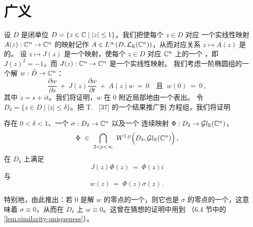 
\section{广义\trSimilarityPrinciple}
\label{sec:generalized-similarity-principle}

%
%

设 $D$ 是闭单位\trDisc{} $D=\{z\in\mathbb{C}\mid |z|\leq1\}$。我们把使每个 $z\in D$ 对应%
一个实线性映射 $A(z):\mathbb{C}^{n}\to\mathbb{C}^{n}$ 的映射记作%
 $A\in L^{\infty}(D,\mathcal{L}_{\mathbb{R}}(\mathbb{C}^{n}))$，从而对应关系 $z\mapsto A(z)$ 是\trEssentiallyBounded{}的。%
设 $z\mapsto J(z)$ 是一个\trSmooth{}映射，使每个 $z\in D$ 对应 $\mathbb{C}^{n}$ 上的一个%
\trComplexStructure，即 $J(z)^{2}=-1$，而 $J(z):\mathbb{C}^{n}\to\mathbb{C}^{n}$ 是一个实线性映射。%
我们考虑一阶椭圆\trDifferentialEquation{}组的一个解 $w:\mathring{D}\to\mathbb{C}^{n}$：
\begin{equation}\label{eq:a45-model-system}
\frac{\partial w}{\partial s}\ +\ J(z)\frac{\partial w}{\partial t}\ +\ A(z)w\ =\ 0
\quad\text{且 }\ w(0)\ =\ 0\,,
\end{equation}
其中 $z=s+it$。我们将证明，$w$ 在 $0$ 附近局部地由一个\trHolomorphic{}\trMapping{}表出。%
令 $D_{\delta}=\{z\in D\mid|z|\leq\delta\}$。把 T.~\trCarleman{} [37] 的一个结果推广到%
方程组，我们将证明

\begin{theorem}\label{thm:carleman-similarity-principle}
存在 $0<\delta<1$、一个\trHolomorphic{}\trMapping{} $\sigma:D_{\delta}\to\mathbb{C}^{n}$ 以及一个%
连续映射 $\Phi:D_{\delta}\to\mathcal{G}l_{\mathbb{R}}(\mathbb{C}^{n})$，
\[
\Phi\ \in\ \bigcap_{2<p<\infty}\ W^{1,p}\Bigl(D_{\delta},\mathcal{G}l_{\R}(\C^{n})\Bigr)\,,
\]
在 $D_{\delta}$ 上满足
\[
J(z)\Phi(z)\ =\ \Phi(z)i
\]
与
\[
w(z)\ =\ \Phi(z)\sigma(z)\,.
\]
\end{theorem}

特别地，由此推出：若 $0$ 是解 $w$ 的零点的一个\trAccumulationPoint，则它也是%
\trHolomorphic{}\trMapping{} $\sigma$ 的零点的一个\trAccumulationPoint，这意味着%
 $\sigma\equiv0$，从而在 $D_{\delta}$ 上 $w\equiv0$。这曾在\trArnold{}猜想的证明中用到%
（6.4 节中的\cref{lem:similarity-uniqueness}）。

